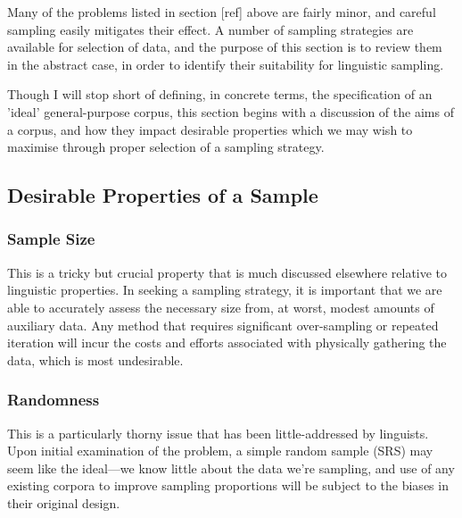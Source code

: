 









Many of the problems listed in section [ref] above are fairly minor, and careful sampling easily mitigates their effect.  A number of sampling strategies are available for selection of data, and the purpose of this section is to review them in the abstract case, in order to identify their suitability for linguistic sampling.

Though I will stop short of defining, in concrete terms, the specification of an 'ideal' general-purpose corpus, this section begins with a discussion of the aims of a corpus, and how they impact desirable properties which we may wish to maximise through proper selection of a sampling strategy. 


\subsection{Desirable Properties of a Sample}


\subsubsection{Sample Size}
This is a tricky but crucial property that is much discussed elsewhere relative to linguistic properties.  In seeking a sampling strategy, it is important that we are able to accurately assess the necessary size from, at worst, modest amounts of auxiliary data.  Any method that requires significant over-sampling or repeated iteration will incur the costs and efforts associated with physically gathering the data, which is most undesirable.



\subsubsection{Randomness}
This is a particularly thorny issue that has been little-addressed by linguists.  Upon initial examination of the problem, a simple random sample (SRS) may seem like the ideal---we know little about the data we're sampling, and use of any existing corpora to improve sampling proportions will be subject to the biases in their original design.  

